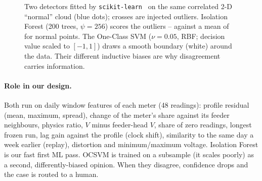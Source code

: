 \documentclass[11pt,a4paper]{article}
\begin{document}
\begin{figure}[H]
\centering
{}
\caption{Two detectors fitted by \texttt{scikit-learn}~\cite{sklearn} on the same correlated 2-D ``normal''
cloud (blue dots); crosses are injected outliers. Isolation Forest (200 trees, $\psi=256$) scores the outliers
\ifOutMin--\ifOutMax{} against a mean of \ifNormMean{} for normal points. The One-Class SVM ($\nu=0.05$, RBF;
decision value scaled to $[-1,1]$) draws a smooth boundary (white) around the data. Their different inductive
biases are why disagreement carries information.}
\label{fig:maps}
\end{figure}

\paragraph{Role in our design.} Both run on daily window features of each meter (48 readings): profile residual
(mean, maximum, spread), change of the meter's share against its feeder neighbours, physics ratio, $V$ minus
feeder-head $V$, share of zero readings, longest frozen run, lag gain against the profile (clock shift),
similarity to the same day a week earlier (replay), distortion and minimum/maximum voltage. Isolation Forest is our fast first ML pass. OCSVM is trained on a
subsample (it scales poorly) as a second, differently-biased opinion. When they disagree, confidence drops
and the case is routed to a human.
\end{document}
